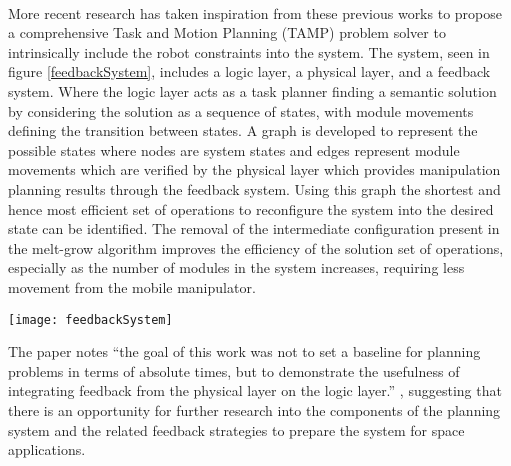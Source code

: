 \\
More recent research has taken inspiration from these previous works to propose a comprehensive Task and Motion Planning (TAMP) problem solver \cite{9438257} to intrinsically include the robot constraints into the system.  The system, seen in figure \ref{feedbackSystem}, includes a logic layer, a physical layer, and a feedback system. Where the logic layer acts as a task planner finding a semantic solution by considering the solution as a sequence of states, with module movements defining the transition between states. A graph is developed to represent the possible states where nodes are system states and edges represent module movements which are verified by the physical layer which provides manipulation planning results through the feedback system. Using this graph the shortest and hence most efficient set of operations to reconfigure the system into the desired state can be identified. The removal of the intermediate configuration present in the melt-grow algorithm improves the efficiency of the solution set of operations, especially as the number of modules in the system increases, requiring less movement from the mobile manipulator.
\newpage
\begin{figure*}[!t]
	\centering
	\texttt{[image: feedbackSystem]}
	\caption{“Architecture of the autonomous robot planning system. The system receives as inputs the start and goal satellite configurations, and iterates between the logic and physical layer until a solution is found.” Image and text from \cite{9438257}}
	\label{feedbackSystem}
\end{figure*}
The paper notes “the goal of this work was not to set a baseline for planning problems in terms of absolute times, but to demonstrate the usefulness of integrating feedback from the physical layer on the logic layer.” \cite{9438257}, suggesting that there is an opportunity for further research into the components of the planning system and the related feedback strategies to prepare the system for space applications.
